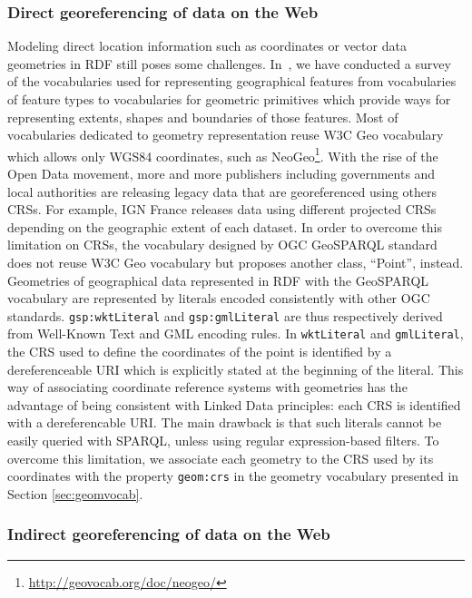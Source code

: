 \subsubsection{Direct georeferencing of data on the Web}
\label{sec:directgeo}
Modeling direct location information such as coordinates or vector data geometries in RDF still poses some challenges. In~\cite{Atemezing:TC12}, we have conducted a survey of the vocabularies used for representing geographical features from vocabularies of feature types to vocabularies for geometric primitives which provide ways for representing extents, shapes and boundaries of those features. 
Most of vocabularies dedicated to geometry representation reuse W3C Geo vocabulary which allows only WGS84 coordinates, such as NeoGeo\footnote{\url{http://geovocab.org/doc/neogeo/}}. With the rise of the Open Data movement, more and more publishers including governments and local authorities are releasing legacy data that are georeferenced using others CRSs. For example, IGN France releases data using different projected CRSs depending on the geographic extent of each dataset. In order to overcome this limitation on CRSs, the vocabulary designed by OGC GeoSPARQL standard  does not reuse W3C Geo vocabulary but proposes another class, ``Point'', instead. Geometries of geographical data represented in RDF with the GeoSPARQL vocabulary are represented by literals encoded consistently with other OGC standards. \texttt{gsp:wktLiteral} and \texttt{gsp:gmlLiteral} are thus respectively derived from Well-Known Text and GML encoding rules. In \texttt{wktLiteral} and \texttt{gmlLiteral}, the CRS used to define the coordinates of the point is identified by a dereferenceable URI which is explicitly stated at the beginning of the literal. This way of associating coordinate reference systems with geometries has the advantage of being consistent with Linked Data principles: each CRS is identified with a dereferencable URI. The main drawback is that such literals cannot be easily queried with SPARQL, unless using regular expression-based filters.  To overcome this limitation, we associate each geometry to the CRS used by its coordinates with the property \texttt{geom:crs} in the geometry vocabulary presented in Section \ref{sec:geomvocab}.

\subsubsection{Indirect georeferencing of data on the Web}
\label{sec:indirectgeo}

